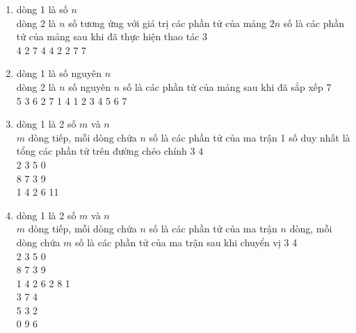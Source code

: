 \begin{enumerate}
	\item {}
	{dòng 1 là số $n$\\
		dòng 2 là $n$ số tương ứng với giá trị các phần tử của mảng}
	{$2n$ số là các phần tử của mảng sau khi đã thực hiện thao tác}
	{3\\4 2 7}
	{4 4 2 2 7 7}
	
	\item {}
	{dòng 1 là số nguyên $n$\\
		dòng 2 là $n$ số nguyên}
	{$n$ số là các phần tử của mảng sau khi đã sắp xếp}
	{7\\5 3 6 2 7 1 4}
	{1 2 3 4 5 6 7}
	
	\item {}
	{dòng 1 là 2 số $m$ và $n$\\
		$m$ dòng tiếp, mỗi dòng chứa $n$ số là các phần tử của ma trận}
	{1 số duy nhất là tổng các phần tử trên đường chéo chính}
	{3 4\\2 3 5 0\\8 7 3 9\\1 4 2 6}
	{11}
	
	\item {}
	{dòng 1 là 2 số $m$ và $n$\\
		$m$ dòng tiếp, mỗi dòng chứa $n$ số là các phần tử của ma trận}
	{$n$ dòng, mỗi dòng chứa $m$ số là các phần tử của ma trận sau khi chuyển vị}
	{3 4\\2 3 5 0\\8 7 3 9\\1 4 2 6}
	{2 8 1\\3 7 4\\5 3 2\\0 9 6}
	

\end{enumerate}

